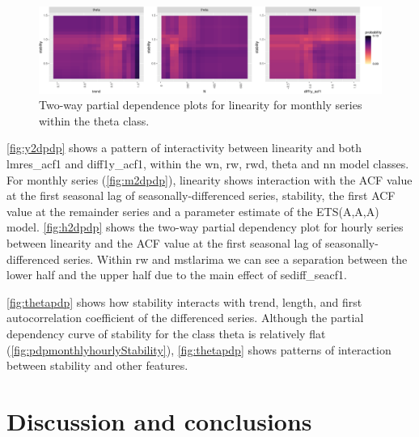 \documentclass[11pt,a4paper,]{article}
\begin{document}
\begin{figure}[!tbp]

{\centering \includegraphics[width=0.95\linewidth]{figure/thetapdp-1} 

}

\caption{Two-way partial dependence plots for linearity for monthly series within the theta class.}\label{fig:thetapdp}
\end{figure}

\autoref{fig:y2dpdp} shows a pattern of interactivity between linearity and both lmres\_acf1 and diff1y\_acf1, within the wn, rw, rwd, theta and nn model classes. For monthly series (\autoref{fig:m2dpdp}), linearity shows interaction with the ACF value at the first seasonal lag of seasonally-differenced series, stability, the first ACF value at the remainder series and a parameter estimate of the ETS(A,A,A) model. \autoref{fig:h2dpdp} shows the two-way partial dependency plot for hourly series between linearity and the ACF value at the first seasonal lag of seasonally-differenced series. Within rw and mstlarima we can see a separation between the lower half and the upper half due to the main effect of sediff\_seacf1.

\autoref{fig:thetapdp} shows how stability interacts with trend, length, and first autocorrelation coefficient of the differenced series. Although the partial dependency curve of stability for the class theta is relatively flat (\autoref{fig:pdpmonthlyhourlyStability}), \autoref{fig:thetapdp} shows patterns of interaction between stability and other features.

\hypertarget{discussion}{%
\section{Discussion and conclusions}\label{discussion}}
\end{document}
